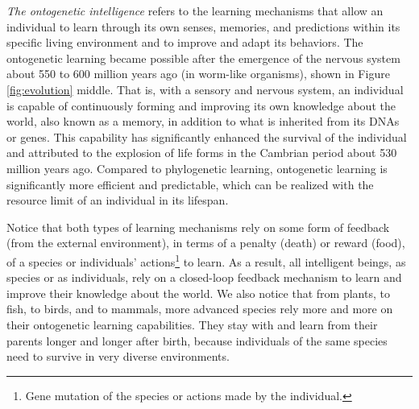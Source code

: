 \documentclass[../../book-main.tex]{subfiles}
\begin{document}
{\em The ontogenetic intelligence} refers to the learning mechanisms that allow an individual to learn through its own senses, memories, and predictions within its specific living environment and to improve and adapt its behaviors. The ontogenetic learning became possible after the emergence of the nervous system about 550 to 600 million years ago (in worm-like organisms), shown in Figure \ref{fig:evolution} middle. That is, with a sensory and nervous system, an individual is capable of continuously forming and improving its own knowledge about the world, also known as a memory, in addition to what is inherited from its DNAs or genes. This capability has significantly enhanced the survival of the individual and attributed to the explosion of life forms in the Cambrian period about 530 million years ago.  Compared to phylogenetic learning, ontogenetic learning is significantly more efficient and predictable, which can be realized with the resource limit of an individual in its lifespan.

Notice that both types of learning mechanisms rely on some form of feedback (from the external environment), in terms of a penalty (death) or reward (food), of a species or individuals' actions\footnote{Gene mutation of the species or actions made by the individual.} to learn. As a result, all intelligent beings, as species or as individuals, rely on a closed-loop feedback mechanism to learn and improve their knowledge about the world. We also notice that from plants, to fish, to birds, and to mammals, more advanced species rely more and more on their ontogenetic learning capabilities. They stay with and learn from their parents longer and longer after birth, because individuals of the same species need to survive in very diverse environments. 
\end{document}
